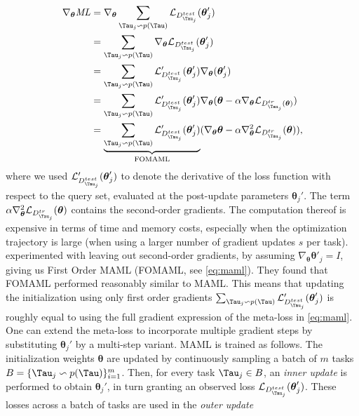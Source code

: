 \begin{align}
     \nabla_{\boldsymbol{\theta}} \mathit{ML} &=\nabla_{\boldsymbol{\theta}} \sum_{\Tau_{j} \backsim p(\Tau)}  \mathcal{L}_{D^{test}_{\Tau_{j}}}(\boldsymbol{\theta}'_{j}) \nonumber\\
    &= \sum_{\Tau_{j} \backsim p(\Tau)} \nabla_{\boldsymbol{\theta}} \mathcal{L}_{D^{test}_{\Tau_{j}}}(\boldsymbol{\theta}'_{j}) \nonumber \\
    &= \sum_{\Tau_{j} \backsim p(\Tau)}  \mathcal{L}'_{D^{test}_{\Tau_{j}}}(\boldsymbol{\theta}'_{j}) \nabla_{\boldsymbol{\theta}}(\boldsymbol{\theta}'_{j}) \nonumber \\
    &= \sum_{\Tau_{j} \backsim p(\Tau)}  \mathcal{L}'_{D^{test}_{\Tau_{j}}}(\boldsymbol{\theta}_{j}') \nabla_{\boldsymbol{\theta}} ( \boldsymbol{\theta} - \alpha \nabla_{\boldsymbol{\theta}} \mathcal{L}_{D^{tr}_{\Tau_{j}}(\boldsymbol{\theta})}) \nonumber \\
     &= \underbrace{\sum_{\Tau_{j} \backsim p(\Tau)}  \mathcal{L}'_{D^{test}_{\Tau_{j}}}(\boldsymbol{\theta}_{j}')}_\textrm{FOMAML} (\nabla_{\boldsymbol{\theta}} \boldsymbol{\theta} - \alpha \nabla_{\boldsymbol{\theta}}^{2} \mathcal{L}_{D^{tr}_{\Tau_{j}}}(\boldsymbol{\theta})),\label{eq:maml}
\end{align} where we used $\mathcal{L}'_{D^{test}_{\Tau_{j}}}(\boldsymbol{\theta}_{j}')$ to denote the derivative of the loss function with respect to the query set, evaluated at the post-update parameters $\boldsymbol{\theta}_{j}'$. The term $\alpha \nabla_{\boldsymbol{\theta}}^{2} \mathcal{L}_{D^{tr}_{\Tau_{j}}}(\boldsymbol{\theta})$ contains the second-order gradients. The computation thereof is expensive in terms of time and memory costs, especially when the optimization trajectory is large (when using a larger number of gradient updates $s$ per task).  experimented with leaving out second-order gradients, by assuming $\nabla_{\boldsymbol{\theta}}\boldsymbol{\theta}'_{j} = I$, giving us First Order MAML (FOMAML, see \autoref{eq:maml}). They found that FOMAML performed reasonably similar to MAML. This means that updating the initialization using only first order gradients $\sum_{\Tau_{j} \backsim p(\Tau)}  \mathcal{L}'_{D^{test}_{\Tau_{j}}}(\boldsymbol{\theta}_{j}')$ is roughly equal to using the full gradient expression of the meta-loss in \autoref{eq:maml}. One can extend the meta-loss to incorporate multiple gradient steps by substituting $\boldsymbol{\theta}_{j}'$ by a multi-step variant.  
MAML is trained as follows. The initialization weights $\boldsymbol{\theta}$ are updated by continuously sampling a batch of $m$ tasks $B = \{\Tau_{j} \backsim p(\Tau)\}_{i=1}^{m}$. Then, for every task $\Tau_{j} \in B$, an \textit{inner update} is performed to obtain $\boldsymbol{\theta}_{j}'$, in turn granting an observed loss $\mathcal{L}_{D^{test}_{\Tau_{j}}}(\boldsymbol{\theta}_{j}')$. These losses across a batch of tasks are used in the \textit{outer update}
